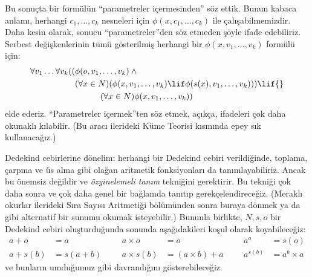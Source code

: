 \documentclass[../../../include/open-logic-section]{subfiles}
\begin{document}
Bu sonuçta bir formülün ``parametreler içermesinden'' söz ettik. Bunun
kabaca anlamı, herhangi $c_1,\ldots,c_k$ nesneleri için
$\phi(x,c_1,\ldots,c_k)$ ile çalışabilmemizdir. Daha kesin olarak, sonucu
``parametreler''den söz etmeden şöyle ifade edebiliriz. Serbest değişkenlerinin
tümü gösterilmiş herhangi bir $\phi(x,v_1,\ldots,v_k)$ formülü için:
	\begin{align*}
			\forall v_1 \ldots \forall v_k((&\phi(o, v_1,\ldots, v_k) \land {}\\
			&	(\forall x \in N)(\phi(x,v_1, \ldots, v_k) \lif \phi(s(x), v_1,\ldots, v_k))) \lif {}\\
			&\hspace{3em} (\forall x \in N)\phi(x, v_1,\ldots, v_k))
	\end{align*}
elde ederiz. ``Parametreler içermek''ten söz etmek, açıkça, ifadeleri çok
daha okunaklı kılabilir. (Bu aracı ilerideki Küme Teorisi kısmında epey sık
kullanacağız.)

Dedekind cebirlerine dönelim: herhangi bir Dedekind cebiri verildiğinde,
toplama, çarpma ve üs alma gibi olağan aritmetik fonksiyonları da
tanımlayabiliriz. Ancak bu önemsiz değildir ve \emph{özyinelemeli tanım}
tekniğini gerektirir. Bu tekniği çok daha sonra ve çok daha genel bir
bağlamda tanıtıp gerekçelendireceğiz. (Meraklı okurlar ilerideki Sıra Sayısı
Aritmetiği bölümünden sonra buraya dönmek ya da
\citealt[pp.~95--8]{Potter2004} gibi alternatif bir sunumu okumak
isteyebilir.) Bununla birlikte, $N,s,o$ bir Dedekind cebiri oluşturduğunda
sonunda aşağıdakileri koşul olarak koyabileceğiz:
\begin{align*}
	{a} + {o} &= {a} & & & {a} \times {o} &= {o} & & & {a}^{o} &= s(o)\\
{a} + {s}({b}) &= {s}({a}+{b}) &&& {a} \times {s}({b}) &= ({a}\times {b}) + {a}  & & & {a}^{{s}({b})} &= {a}^{b} \times {a}
\end{align*}
ve bunların umduğumuz gibi davrandığını gösterebileceğiz.
\end{document}
